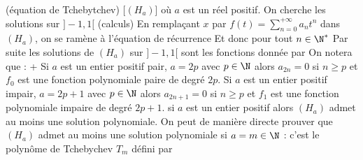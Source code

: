 \begin{exem}
\unite(équation de Tchebytchev)
[$(H_a)$]
où $a$ est un réel positif. On cherche les solutions \dse sur $]-1,1[$
\mini(calculs)
En remplaçant $x$ par $f(t)=\sum_{n=0}^{+\infty} a_nt^n$ dans $(H_a)$, on se ramène à l'équation de récurrence
Et donc pour tout $n\in\N^*$
Par suite les solutions de $(H_a)$ sur $]-1,1[$ sont les fonctions donnée par
On notera que :
\xit+ Si $a$ est un entier positif pair, $a=2p$ avec $p\in\N$ alors $a_{2n}=0$ si $n\geq p$ et $f_0$ est une fonction polynomiale paire de degré $2p$.
\xit Si $a$ est un entier positif impair, $a=2p+1$ avec $p\in\N$ alors $a_{2n+1}=0$ si $n\geq p$ et $f_1$ est une fonction polynomiale impaire de degré $2p+1$.
\xit si $a$ est un entier positif alors $(H_a)$ admet au moins une solution polynomiale.
\exit
\endmini
\nb On peut de manière directe prouver que $(H_a)$ admet au moins une solution polynomiale si $a=m\in\N$ : c'est le polynôme de Tchebychev $T_m$ défini par
\endnb
\end{exem}


